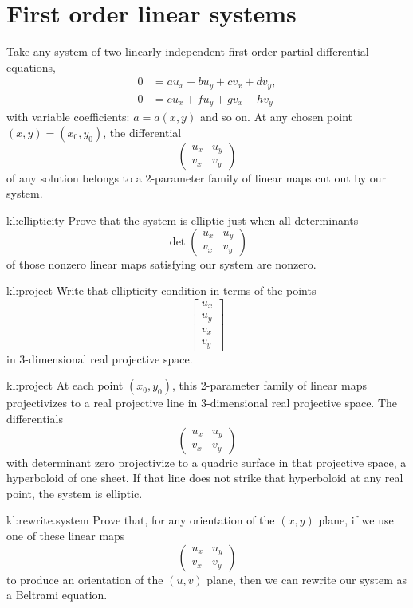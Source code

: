 \section{First order linear systems}
Take any system of two linearly independent first order partial differential equations,
\begin{align*}
0 &= a u_x + b u_y + c v_x + d v_y, \\
0 &= e u_x + f u_y + g v_x + h v_y
\end{align*}
with variable coefficients: \(a=a(x,y)\) and so on.
At any chosen point \((x,y)=(x_0,y_0)\), the differential
\[
\begin{pmatrix}
u_x & u_y \\
v_x & v_y
\end{pmatrix}
\]
of any solution belongs to a \(2\)-parameter family of linear maps cut out by our system.
\begin{problem}{kl:ellipticity}
Prove that the system is elliptic just when all determinants
\[
\det
\begin{pmatrix}
u_x & u_y \\
v_x & v_y
\end{pmatrix}
\]
of those nonzero linear maps satisfying our system are nonzero.
\end{problem}
\begin{problem}{kl:project}
Write that ellipticity condition in terms of the points
\[
\begin{bmatrix}
u_x\\
u_y\\
v_x\\
v_y
\end{bmatrix}
\]
in \(3\)-dimensional real projective space.
\end{problem}
\begin{answer}{kl:project}
At each point \((x_0,y_0)\), this 2-parameter family of linear maps projectivizes to a real projective line in 3-dimensional real projective space.
The differentials
\[
\begin{pmatrix}
u_x & u_y \\
v_x & v_y
\end{pmatrix}
\]
with determinant zero projectivize to a quadric surface in that projective space, a hyperboloid of one sheet.
If that line does not strike that hyperboloid at any real point, the system is elliptic.
\end{answer}
\begin{problem}{kl:rewrite.system}
Prove that, for any orientation of the \((x,y)\) plane, if we use one of these linear maps 
\[
\begin{pmatrix}
u_x & u_y \\
v_x & v_y
\end{pmatrix}
\]
to produce an orientation of the \((u,v)\) plane, then we can rewrite our system as a Beltrami equation.
\end{problem}
